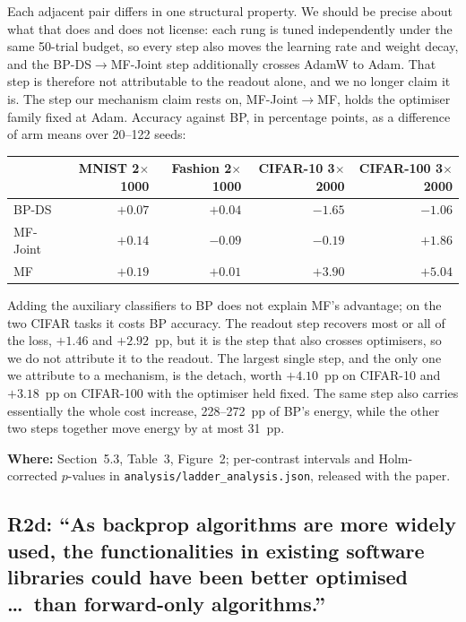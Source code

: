 \documentclass[11pt,a4paper]{article}
\newcommand{\MF}{MF}
\newcommand{\BP}{BP}
\newcommand{\BPDS}{BP-DS}
\newcommand{\MFJ}{MF-Joint}
\newcommand{\where}[1]{\par\smallskip\noindent\textbf{Where:} #1\par}
\begin{document}
\noindent
Each adjacent pair differs in one structural property. We should be precise
about what that does and does not license: each rung is tuned independently
under the same \num{50}-trial budget, so every step also moves the learning
rate and weight decay, and the \BPDS{}$\rightarrow$\MFJ{} step additionally
crosses AdamW to Adam. That step is therefore not attributable to the readout
alone, and we no longer claim it is. The step our mechanism claim rests on,
\MFJ{}$\rightarrow$\MF{}, holds the optimiser family fixed at Adam. Accuracy
against \BP{}, in percentage points, as a difference of arm means over
\numrange{20}{122} seeds:

\begin{center}\small
\begin{tabular}{lrrrr}
  \toprule
  & MNIST 2$\times$1000 & Fashion 2$\times$1000 & CIFAR-10 3$\times$2000 & CIFAR-100 3$\times$2000 \\
  \midrule
  \BPDS{} & $+0.07$ & $+0.04$ & $-1.65$ & $-1.06$ \\
  \MFJ{}  & $+0.14$ & $-0.09$ & $-0.19$ & $+1.86$ \\
  \MF{}   & $+0.19$ & $+0.01$ & $+3.90$ & $+5.04$ \\
  \bottomrule
\end{tabular}
\end{center}

\noindent
Adding the auxiliary classifiers to \BP{} does not explain \MF{}'s advantage;
on the two CIFAR tasks it costs \BP{} accuracy. The readout step recovers most
or all of the loss, $+\num{1.46}$ and $+\num{2.92}$~pp, but it is the step that also
crosses optimisers, so we do not attribute it to the readout. The largest
single step, and the only one we attribute to a mechanism, is the detach,
worth $+\num{4.10}$~pp on CIFAR-10 and $+\num{3.18}$~pp on CIFAR-100 with the
optimiser held fixed. The
same step also carries essentially the whole cost increase,
\numrange{228}{272}~pp of \BP{}'s energy, while the other two steps together
move energy by at most \num{31}~pp.

\where{Section~5.3, Table~3, Figure~2; per-contrast intervals and
Holm-corrected $p$-values in \texttt{analysis/ladder\_analysis.json},
released with the paper.}

\subsection*{R2d: ``As backprop algorithms are more widely used, the
functionalities in existing software libraries could have been better
optimised \dots\ than forward-only algorithms.''}
\end{document}
